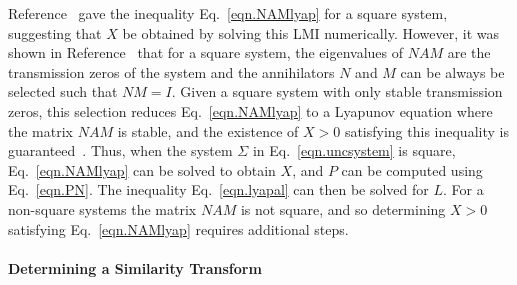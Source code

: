 \documentclass[]{../sty/JGCD}
\theoremstyle{examplestyle}
\begin{document}
  Reference\ \cite{huang.designspr.1999} gave the inequality Eq.\ \eqref{eqn.NAMlyap} for a square system, suggesting that $X$ be obtained by solving this LMI numerically.
  However, it was shown in Reference\ \cite{kouvaritakis.part1.1976} that for a square system, the eigenvalues of $NAM$ are the transmission zeros of the system and the annihilators $N$ and $M$ can be always be selected such that $NM=I$.
  Given a square system with only stable transmission zeros, this selection reduces Eq.\ \eqref{eqn.NAMlyap} to a Lyapunov equation where the matrix $NAM$ is stable, and the existence of $X>0$ satisfying this inequality is guaranteed\ \cite{barkana.comments.2004}.
  Thus, when the system $\Sigma$ in Eq.\ \eqref{eqn.uncsystem} is square, Eq.\ \eqref{eqn.NAMlyap} can be solved to obtain $X$, and $P$ can be computed using Eq.\ \eqref{eqn.PN}.
  The inequality Eq.\ \eqref{eqn.lyapal} can then be solved for $L$.
  For a non-square systems the matrix $NAM$ is not square, and so determining $X>0$ satisfying Eq.\ \eqref{eqn.NAMlyap} requires additional steps.

  \paragraph{Determining a Similarity Transform}
\end{document}
